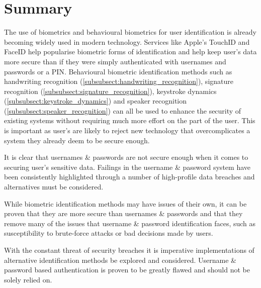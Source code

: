 \documentclass[12pt]{article}
\begin{document}
	\section{Summary}
	The use of biometrics and behavioural biometrics for user identification is already becoming widely used in modern technology. Services like Apple's TouchID and FaceID help popularise biometric forms of identification and help keep user's data more secure than if they were simply authenticated with usernames and passwords or a PIN. Behavioural biometric identification methods such as handwriting recognition (\ref{subsubsect:handwriting_recognition}), signature recognition (\ref{subsubsect:signature_recognition}), keystroke dynamics (\ref{subsubsect:keystroke_dynamics}) and speaker recognition (\ref{subsubsect:speaker_recognition}) can all be used to enhance the security of existing systems without requiring much more effort on the part of the user. This is important as user's are likely to reject new technology that overcomplicates a system they already deem to be secure enough.
	
	It is clear that usernames \& passwords are not secure enough when it comes to securing user's sensitive data. Failings in the username \& password system have been consistently highlighted through a number of high-profile data breaches and alternatives must be considered.
	
	While biometric identification methods may have issues of their own, it can be proven that they are more secure than usernames \& passwords and that they remove many of the issues that username \& password identification faces, such as susceptibility to brute-force attacks or bad decisions made by users.
	
	With the constant threat of security breaches it is imperative implementations of alternative identification methods be explored and considered. Username \& password based authentication is proven to be greatly flawed and should not be solely relied on.
	
	
	 
	
\end{document}

